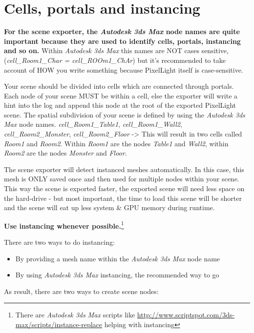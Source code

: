 \chapter{Cells, portals and instancing}
\textbf{For the scene exporter, the \emph{Autodesk 3ds Max} node names are quite important because they are used to identify cells, portals, instancing and so on.} Within \emph{Autodesk 3ds Max} this names are NOT cases sensitive, (\emph{cell\_Room1\_Char = cell\_ROOm1\_ChAr}) but it's recommended to take account of HOW you write something because PixelLight itself is case-sensitive.

Your scene should be divided into cells which are connected through portals. Each node of your scene MUST be within a cell, else the exporter will write a hint into the log and append this node at the root of the exported PixelLight scene. The spatial subdivision of your scene is defined by using the \emph{Autodesk 3ds Max} node names. \emph{cell\_Room1\_Table1}, \emph{cell\_Room1\_Wall2}, \emph{cell\_Room2\_Monster}, \emph{cell\_Room2\_Floor} -> This will result in two cells called \emph{Room1} and \emph{Room2}. Within \emph{Room1} are the nodes \emph{Table1} and \emph{Wall2}, within \emph{Room2} are the nodes \emph{Monster} and \emph{Floor}.

The scene exporter will detect instanced meshes automatically. In this case, this mesh is ONLY saved once and then used for multiple nodes within your scene. This way the scene is exported faster, the exported scene will need less space on the hard-drive - but most important, the time to load this scene will be shorter and the scene will eat up less system \& GPU memory during runtime.

\textbf{Use instancing whenever possible.}\footnote{There are \emph{Autodesk 3ds Max} scripts like \url{http://www.scriptspot.com/3ds-max/scripts/instance-replace} helping with instancing}

There are two ways to do instancing:

\begin{itemize}
\item{By providing a mesh name within the \emph{Autodesk 3ds Max} node name}
\item{By using \emph{Autodesk 3ds Max} instancing, the recommended way to go}
\end{itemize}

As result, there are two ways to create scene nodes:

